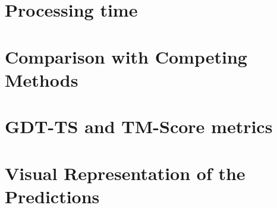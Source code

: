 \section{Processing time}

\section{Comparison with Competing Methods}



\section{GDT-TS and TM-Score metrics}

\section{Visual Representation of the Predictions}

